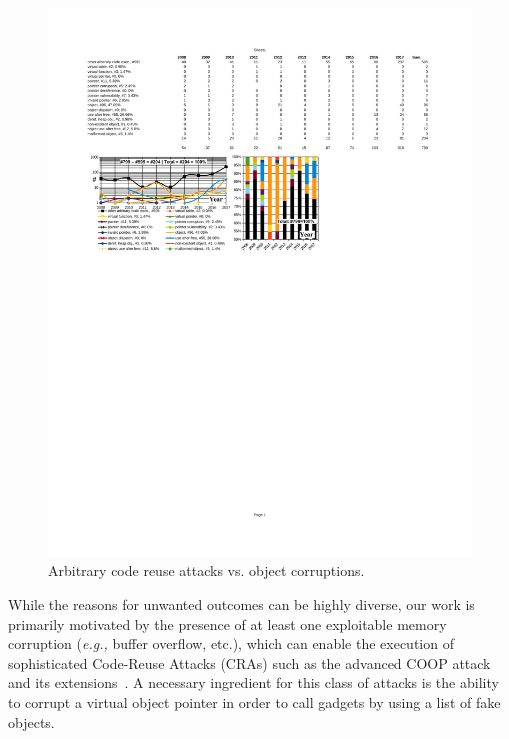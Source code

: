\begin{figure}[t!]
\centering
\hspace{-.323cm}
  \includegraphics[scale=0.77]{figures/distri.pdf}
\caption{Arbitrary code reuse attacks vs. object corruptions.}
\label{ace:nvd:statistics}
\vspace{-.7cm}
\end{figure}

While the reasons for unwanted outcomes can be highly diverse, our work is primarily motivated by the presence of at least one exploitable
memory corruption (\textit{e.g.,} buffer overflow, etc.), which can enable the execution of sophisticated Code-Reuse Attacks (CRAs) such as the advanced COOP attack~\cite{schuster:coop} and its 
extensions~\cite{crane:readactor++, subversive-c:lettner, ctf:coop, loop:oriented}. A necessary ingredient for this class of attacks is the ability
to corrupt a virtual object pointer in order to call gadgets by using a list of fake objects.

